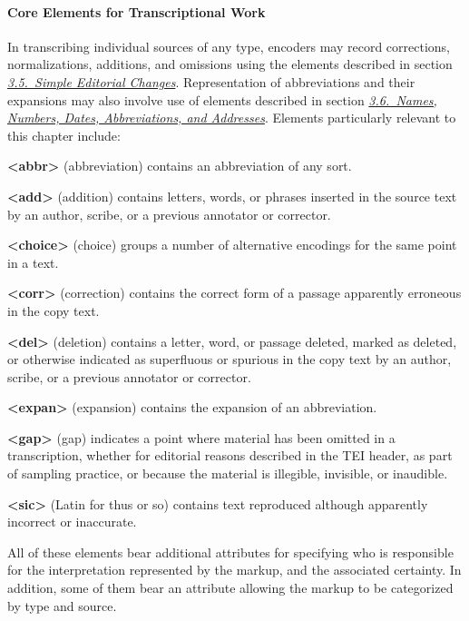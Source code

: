 \paragraph[{Core Elements for Transcriptional Work}]{Core Elements for Transcriptional Work}\label{PHCO}\par
In transcribing individual sources of any type, encoders may record corrections, normalizations, additions, and omissions using the elements described in section \textit{\hyperref[COED]{3.5.\ Simple Editorial Changes}}. Representation of abbreviations and their expansions may also involve use of elements described in section \textit{\hyperref[CONA]{3.6.\ Names, Numbers, Dates, Abbreviations, and Addresses}}. Elements particularly relevant to this chapter include: 
\begin{sansreflist}
  
\item [\textbf{<abbr>}] (abbreviation) contains an abbreviation of any sort.
\item [\textbf{<add>}] (addition) contains letters, words, or phrases inserted in the source text by an author, scribe, or a previous annotator or corrector.
\item [\textbf{<choice>}] (choice) groups a number of alternative encodings for the same point in a text.
\item [\textbf{<corr>}] (correction) contains the correct form of a passage apparently erroneous in the copy text.
\item [\textbf{<del>}] (deletion) contains a letter, word, or passage deleted, marked as deleted, or otherwise indicated as superfluous or spurious in the copy text by an author, scribe, or a previous annotator or corrector.
\item [\textbf{<expan>}] (expansion) contains the expansion of an abbreviation.
\item [\textbf{<gap>}] (gap) indicates a point where material has been omitted in a transcription, whether for editorial reasons described in the TEI header, as part of sampling practice, or because the material is illegible, invisible, or inaudible.
\item [\textbf{<sic>}] (Latin for thus or so) contains text reproduced although apparently incorrect or inaccurate.
\end{sansreflist}
\par
All of these elements bear additional attributes for specifying who is responsible for the interpretation represented by the markup, and the associated certainty. In addition, some of them bear an attribute allowing the markup to be categorized by type and source. 
